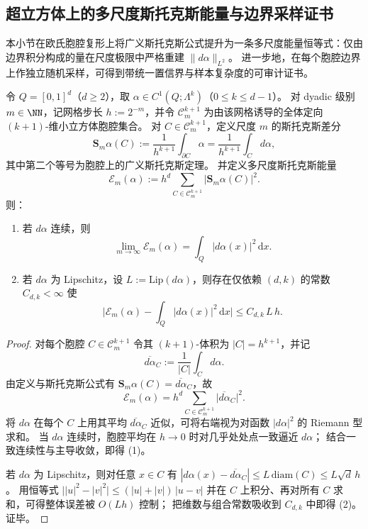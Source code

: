 \subsection{超立方体上的多尺度斯托克斯能量与边界采样证书}\label{subsec:conclusion-multiscale-stokes-energy-sampling}
本小节在欧氏胞腔复形上将广义斯托克斯公式提升为一条多尺度能量恒等式：仅由边界积分构成的量在尺度极限中严格重建 \(\|d\alpha\|_{L^2}\)。
进一步地，在每个胞腔边界上作独立随机采样，可得到带统一置信界与样本复杂度的可审计证书。





\begin{theorem}[多尺度斯托克斯能量的 \(L^2\) 重建]\label{thm:conclusion-multiscale-stokes-energy-l2-reconstruction}
令 \(Q=[0,1]^d\)（\(d\ge 2\)），取 \(\alpha\in C^{1}(Q;\Lambda^{k})\)（\(0\le k\le d-1\)）。
对 dyadic 级别 \(m\in\NN\)，记网格步长 \(h:=2^{-m}\)，并令 \(\mathcal C_m^{k+1}\) 为由该网格诱导的全体定向 \((k+1)\)-维小立方体胞腔集合。
对 \(C\in\mathcal C_m^{k+1}\)，定义尺度 \(m\) 的斯托克斯差分
\[
\mathbf S_m\alpha(C)
:=\frac{1}{h^{k+1}}\int_{\partial C}\alpha
=\frac{1}{h^{k+1}}\int_C d\alpha,
\]
其中第二个等号为胞腔上的广义斯托克斯定理。
并定义多尺度斯托克斯能量
\[
\mathcal E_m(\alpha):=h^d\sum_{C\in\mathcal C_m^{k+1}}\bigl|\mathbf S_m\alpha(C)\bigr|^2.
\]
则：
\begin{enumerate}
  \item 若 \(d\alpha\) 连续，则
  \[
  \lim_{m\to\infty}\mathcal E_m(\alpha)=\int_Q |d\alpha(x)|^2\,\mathrm dx.
  \]
  \item 若 \(d\alpha\) 为 Lipschitz，设 \(L:=\mathrm{Lip}(d\alpha)\)，则存在仅依赖 \((d,k)\) 的常数 \(C_{d,k}<\infty\) 使
  \[
  \biggl|\mathcal E_m(\alpha)-\int_Q |d\alpha(x)|^2\,\mathrm dx\biggr|
  \le C_{d,k}\,L\,h.
  \]
\end{enumerate}
\end{theorem}

\begin{proof}
对每个胞腔 \(C\in\mathcal C_m^{k+1}\) 令其 \((k{+}1)\)-体积为 \(|C|=h^{k+1}\)，并记
\[
\overline{d\alpha}_C:=\frac1{|C|}\int_C d\alpha.
\]
由定义与斯托克斯公式有 \(\mathbf S_m\alpha(C)=\overline{d\alpha}_C\)，故
\[
\mathcal E_m(\alpha)
=h^d\sum_{C\in\mathcal C_m^{k+1}}\bigl|\overline{d\alpha}_C\bigr|^2.
\]
将 \(d\alpha\) 在每个 \(C\) 上用其平均 \(\overline{d\alpha}_C\) 近似，可将右端视为对函数 \(|d\alpha|^2\) 的 Riemann 型求和。
当 \(d\alpha\) 连续时，胞腔平均在 \(h\to 0\) 时对几乎处处点一致逼近 \(d\alpha\)；
结合一致连续性与主导收敛，即得 (1)。

若 \(d\alpha\) 为 Lipschitz，则对任意 \(x\in C\) 有
\(
|d\alpha(x)-\overline{d\alpha}_C|\le L\,\mathrm{diam}(C)\le L\sqrt d\,h
\)。
用恒等式
\(
\bigl||u|^2-|v|^2\bigr|\le (|u|+|v|)\,|u-v|
\)
并在 \(C\) 上积分、再对所有 \(C\) 求和，可得整体误差被 \(O(Lh)\) 控制；
把维数与组合常数吸收到 \(C_{d,k}\) 中即得 (2)。证毕。
\end{proof}

